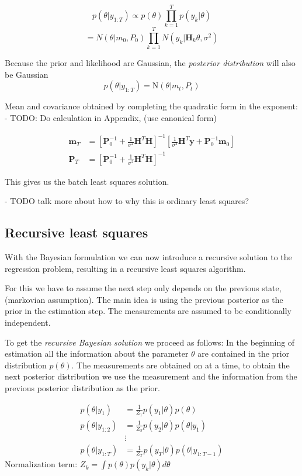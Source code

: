 $$ p(\theta | y_{1:T})  \propto p(\theta) \prod^T_{k=1} p (y_k | \theta) $$
$$ = N(\theta | m_0, P_0) \prod^T_{k=1} N(y_k | \textbf{H}_k \theta, \sigma^2) $$

Because the prior and likelihood are Gaussian, the \textit{posterior distribution}
will also be Gaussian
$$ p(\theta | y_{1:T}) = \text{N}(\theta | m_t, P_t) $$

Mean and covariance obtained by completing the quadratic form in the exponent:
- TODO: Do calculation in Appendix, (use canonical form)

\begin{align}
  \mathbf{m}_T &= \left[ \mathbf{P}^{-1}_0 + \frac{1}{\sigma^2} \mathbf{H}^T \mathbf{H}
                 \right]^{-1} \left[\frac{1}{\sigma^2} \mathbf{H}^T \mathbf{y} +
  \mathbf{P}^{-1}_0 \mathbf{m}_0 \right] \\
  \mathbf{P}_T &= \left[\mathbf{P}_0^{-1} + \frac{1}{\sigma^2} \mathbf{H}^T \mathbf{H}
                 \right]^{-1}
\end{align}

This gives us the batch least squares solution.

- TODO talk more about how to why this is ordinary least squares?

\subsection{Recursive least squares} \label{RLS}
With the Bayesian formulation we can now  introduce a recursive
solution to the regression problem, resulting in a recursive least squares
algorithm.

For this we have to assume the next step only
depends on the previous state, (markovian assumption).
The main idea is using the previous posterior as the prior in the estimation
step.
The measurements are assumed to be conditionally independent.

To get the \textit{recursive Bayesian solution} we proceed as follows:
In the beginning of estimation all the information about the parameter $\theta$
are contained in the prior distribution $p(\theta)$.
The measurements are obtained on at a time, to
obtain the next posterior distribution we use the measurement and the information
from the previous posterior distribution as the prior.

\begin{align*}
  p(\theta | y_{1}) &= \frac{1}{Z_1} p(y_1 | \theta) p(\theta) \\
  p(\theta | y_{1:2}) &= \frac{1}{Z_2} p(y_2 | \theta) p(\theta | y_1) \\
                    &\vdots \\
  p(\theta | y_{1:T}) &= \frac{1}{Z_T} p(y_T | \theta) p(\theta | y_{1:T-1})
\end{align*}
Normalization term: $Z_k = \int p(\theta) p(y_k | \theta) d\theta$ %


